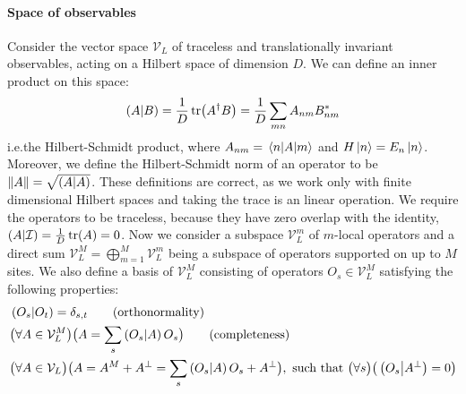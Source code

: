 \paragraph{Space of observables}Consider the vector space \(\mathcal{V}_L\) of traceless and translationally invariant
observables, acting on a Hilbert space of dimension \(D\). We can define an inner product on this space:
\begin{equation}
  \left(A \middle| B\right) = \frac{1}{D}\tr(A^{\dagger}B) = \frac{1}{D} \sum_{mn} A_{nm}B_{nm}^{\ast}
\end{equation}
i.e.\;the Hilbert-Schmidt product, where \(A_{nm} = \matrixel{n}{A}{m}\) and \(H\ket{n} = E_n \ket{n}\). Moreover,
we define the Hilbert-Schmidt norm of an operator to be \(\norm{A} = \sqrt{\left(A \middle| A\right)}\).
These definitions are correct, as we work only with finite dimensional Hilbert spaces and taking the trace is an
linear operation. We require the operators to be traceless, because they have zero overlap with the identity, \(\left(A|\mathcal{I}\right)=\frac{1}{D}\tr(A) = 0\).
Now we consider a subspace \(\mathcal{V}_L^m\) of \(m\)-local operators and a direct sum
\(\mathcal{V}_L^M = \bigoplus_{m = 1}^M \mathcal{V}_L^m\) being a subspace of operators supported on up to \(M\) sites.
We also define a basis of \(\mathcal{V}_L^M\) consisting of operators \(O_s\in \mathcal{V}_L^M\)
satisfying the following properties:
\begin{align}
   & \hs{O_s}{O_{t}} = \delta_{s,t} \tag{\text{orthonormality}}                                    \nonumber{}\\
   & \big(\forall A \in \mathcal{V}_L^M\big) \big(A = \sum_s \hs{O_s}{A} O_s\big) \tag{\text{completeness}}   \nonumber{}\\
   & \big(\forall A \in \mathcal{V}_L \big) \big( A = A^M + A^{\perp} = \sum_s \hs{O_s}{A} O_s + A^{\perp}\big) ,
  \text{ such that } \big(\forall s\big) \big( \hs{O_s}{A^{\perp}} = 0\big)\label{eq:basis}
\end{align}


